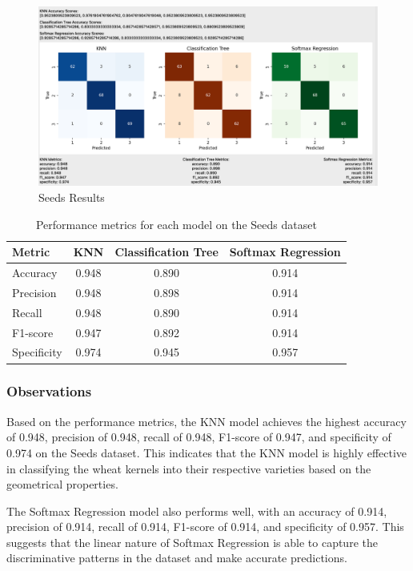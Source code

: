 \documentclass[letterpaper,10pt]{article}
\begin{document}
\begin{figure}[ht]
    \centering
    \includegraphics[width=1.0\textwidth]{seeds_results.png}
    \caption{Seeds Results}
    \label{seeds_results}
\end{figure}
\begin{table}[ht]
\centering
\caption{Performance metrics for each model on the Seeds dataset}
\label{tab:seeds_metrics}
\begin{tabular}{|l|c|c|c|}
\hline
\textbf{Metric} & \textbf{KNN} & \textbf{Classification Tree} & \textbf{Softmax Regression} \\
\hline
Accuracy & 0.948 & 0.890 & 0.914 \\
\hline
Precision & 0.948 & 0.898 & 0.914 \\
\hline
Recall & 0.948 & 0.890 & 0.914 \\
\hline
F1-score & 0.947 & 0.892 & 0.914 \\
\hline
Specificity & 0.974 & 0.945 & 0.957 \\
\hline
\end{tabular}
\end{table}

\subsubsection{Observations}

Based on the performance metrics, the KNN model achieves the highest accuracy of 0.948, precision of 0.948, recall of 0.948, F1-score of 0.947, and specificity of 0.974 on the Seeds dataset. This indicates that the KNN model is highly effective in classifying the wheat kernels into their respective varieties based on the geometrical properties. \par

The Softmax Regression model also performs well, with an accuracy of 0.914, precision of 0.914, recall of 0.914, F1-score of 0.914, and specificity of 0.957. This suggests that the linear nature of Softmax Regression is able to capture the discriminative patterns in the dataset and make accurate predictions. \par
\end{document}
